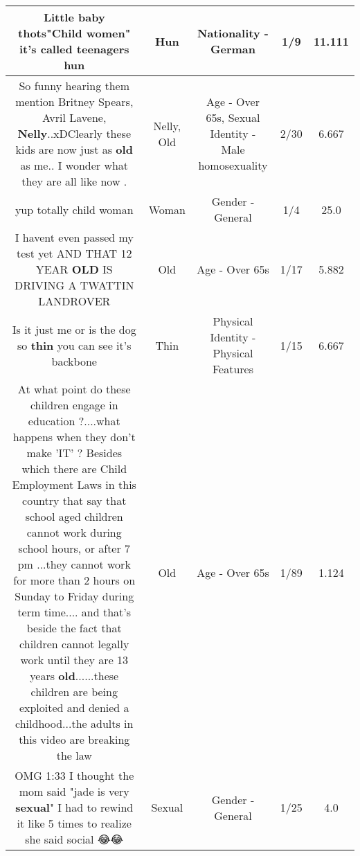 \documentclass[11pt]{article}
\newlength\mylength
\begin{document}
\begin{center}
\begin{longtable}{|C{.65\mylength}|C{.30\mylength}|C{.12\mylength}|C{.12\mylength}|C{.12\mylength}|}
  \small Little baby thots"Child women" it's called teenagers hun\normalsize   & Hun & Nationality - German & 1/9 & 11.111 \\  \hline
  \small So funny hearing them mention Britney Spears, Avril Lavene, \textbf{Nelly}..xDClearly these kids are now just as \textbf{old} as me.. I wonder what they are all like now .\normalsize   & Nelly, Old & Age - Over 65s, Sexual Identity - Male homosexuality & 2/30 & 6.667 \\  \hline
  \small yup totally child woman\normalsize   & Woman & Gender - General & 1/4 & 25.0 \\  \hline
  \small I havent even passed my test yet AND THAT 12 YEAR \textbf{OLD} IS DRIVING A TWATTIN LANDROVER\normalsize   & Old & Age - Over 65s & 1/17 & 5.882 \\  \hline
  \small Is it just me or is the dog so \textbf{thin} you can see it's backbone\normalsize   & Thin & Physical Identity - Physical Features & 1/15 & 6.667 \\  \hline
  \small At what point do these children engage in education ?....what happens when they don't make 'IT' ?  Besides which there are Child Employment Laws in this country that say that school aged children cannot work during school hours,  or after 7 pm ...they cannot work for more than 2 hours on Sunday to Friday during term time.... and that's beside the fact that children cannot legally work until they are 13 years \textbf{old}......these children are being exploited and denied a childhood...the adults in this video are breaking the law\normalsize   & Old & Age - Over 65s & 1/89 & 1.124 \\  \hline
  \small OMG 1:33 I thought the mom said "jade is very \textbf{sexual}" I had to rewind it like 5 times to realize she said social 😂😂\normalsize   & Sexual & Gender - General & 1/25 & 4.0 \\  \hline

\end{longtable}
\end{center}
\end{document}
